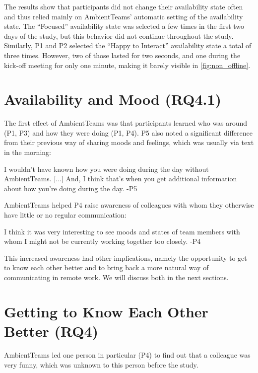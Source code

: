 The results show that participants did not change their availability state often and thus relied mainly on AmbientTeams' automatic setting of the availability state. The \enquote{Focused} availability state was selected a few times in the first two days of the study, but this behavior did not continue throughout the study. Similarly, P1 and P2 selected the \enquote{Happy to Interact} availability state a total of three times. However, two of those lasted for two seconds, and one during the kick-off meeting for only one minute, making it barely visible in \autoref{fig:non_offline}.

\section{Availability and Mood (RQ4.1)}
\label{section:availability_and_mood}
The first effect of AmbientTeams was that participants learned who was around (P1, P3) and how they were doing (P1, P4). P5 also noted a significant difference from their previous way of sharing moods and feelings, which was usually via text in the morning:


\begin{displayquote}[][]
    [...] I wouldn't have known how you were doing during the day without AmbientTeams. [...] And, I think that's when you get additional information about how you're doing during the day. -P5
\end{displayquote}

AmbientTeams helped P4 raise awareness of colleagues with whom they otherwise have little or no regular communication:

\begin{displayquote}
    I think it was very interesting to see moods and states of team members with whom I might not be currently working together too closely. -P4
\end{displayquote}

This increased awareness had other implications, namely the opportunity to get to know each other better and to bring back a more natural way of communicating in remote work. We will discuss both in the next sections.

\section{Getting to Know Each Other Better (RQ4)}
\label{section:getting_to_know_each_other_better}
AmbientTeams led one person in particular (P4) to find out that a colleague was very funny, which was unknown to this person before the study.

